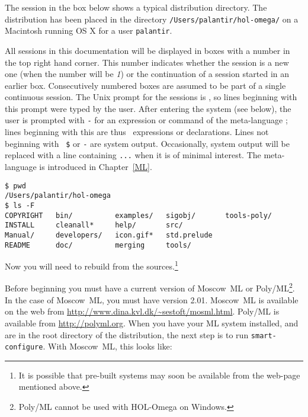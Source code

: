 The session in the box below shows a typical distribution directory.
The \HOLW{} distribution has been placed
in the directory {\small\tt /Users/palantir/hol-omega/}
on a Macintosh running OS X
for a user {\small\tt palantir}.

All sessions in this documentation will be displayed in boxes with a
number in the top right hand corner.  This number indicates whether
the session is a new one (when the number will be {\small\sl 1}) or
the continuation of a session started in an earlier box.
Consecutively numbered boxes are assumed to be part of a single
continuous session.  The Unix prompt for the sessions is
\texttt{\small \dol}, so lines beginning with this prompt were typed
by the user.  After entering the \HOLW{} system (see below), the user
is prompted with {\small\verb|-|} for an expression or command of the
\HOLW{} meta-language \ML; lines beginning with this are thus \ML\
expressions or declarations.  Lines not beginning with \texttt{\small
  \$} or {\small\verb|-|} are system output.  Occasionally, system
output will be replaced with a line containing {\small\verb|...|} when
it is of minimal interest. The meta-language \ML{} is introduced in
Chapter~\ref{ML}.

\setcounter{sessioncount}{0}
\begin{session}
\begin{verbatim}
$ pwd
/Users/palantir/hol-omega
$ ls -F
COPYRIGHT   bin/          examples/   sigobj/       tools-poly/
INSTALL	    cleanall*     help/       src/
Manual/	    developers/   icon.gif*   std.prelude 
README      doc/          merging     tools/
\end{verbatim}
\end{session}

Now you will need to rebuild \HOLW{} from the sources.\footnote{It is
  possible that pre-built systems may soon be available from the
  web-page mentioned above.}

Before beginning you must have a current version of Moscow~ML or
Poly/ML\footnote{Poly/ML cannot be used with HOL-Omega on Windows.}.  In the
case of Moscow~ML, you must have version 2.01.  Moscow~ML is available
on the web from \url{http://www.dina.kvl.dk/~sestoft/mosml.html}.
Poly/ML is available from \url{http://polyml.org}. When you have your
ML system installed, and are in the root directory of the
distribution, the next step is to run \texttt{smart-configure}.  With
Moscow~ML, this looks like:

